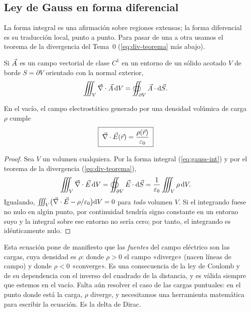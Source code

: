 

\subsection{Ley de Gauss en forma diferencial}\label{sec:gauss-diferencial}
La forma integral es una afirmación sobre regiones extensas; la forma diferencial es su traducción local, punto a punto. Para
pasar de una a otra usamos el teorema de la divergencia del Tema~0 (\cref{eq:div-teorema} más abajo).

\begin{teorema}\label{teo:divergencia}
Si $\vec{A}$ es un campo vectorial de clase $C^{1}$ en un entorno de un sólido acotado $V$ de borde $S=\partial V$ orientado con
la normal exterior,
\begin{equation}\label{eq:div-teorema}
  \iiint_{V}\vec{\nabla}\cdot\vec{A}\,\mathrm{d} V=\oiint_{\partial V}\vec{A}\cdot\mathrm{d}\vec{S}.
\end{equation}
\end{teorema}

\begin{teorema}\label{teo:gauss-dif}
En el vacío, el campo electrostático generado por una densidad volúmica de carga $\rho$ cumple
\begin{equation}\label{eq:gauss-dif}
  \boxed{\;\vec{\nabla}\cdot\vec{E}(\vec{r})=\frac{\rho(\vec{r})}{\varepsilon_{0}}\;}
\end{equation}
\end{teorema}
\begin{proof}
Sea $V$ un volumen cualquiera. Por la forma integral (\cref{eq:gauss-int}) y por el teorema de la divergencia
(\cref{eq:div-teorema}),
\[
  \iiint_{V}\vec{\nabla}\cdot\vec{E}\,\mathrm{d} V=\oiint_{\partial V}\vec{E}\cdot\mathrm{d}\vec{S}=\frac{1}{\varepsilon_{0}}\iiint_{V}\rho\,\mathrm{d} V .
\]
Igualando, $\iiint_{V}\bigl(\vec{\nabla}\cdot\vec{E}-\rho/\varepsilon_{0}\bigr)\mathrm{d} V=0$ para \emph{todo} volumen $V$. Si el integrando fuese no nulo en
algún punto, por continuidad tendría signo constante en un entorno suyo y la integral sobre ese entorno no sería cero;
por tanto, el integrando es idénticamente nulo.
\end{proof}

Esta ecuación pone de manifiesto que las \emph{fuentes} del campo eléctrico son las cargas, cuya densidad es $\rho$: donde
$\rho>0$ el campo «diverge» (nacen líneas de campo) y donde $\rho<0$ «converge». Es una consecuencia de la ley de Coulomb
y de su dependencia con el inverso del cuadrado de la distancia, y es válida siempre que estemos en el vacío. Falta aún
resolver el caso de las cargas puntuales: en el punto donde está la carga, $\rho$ diverge, y necesitamos una herramienta
matemática para escribir la ecuación. Es la delta de Dirac.

